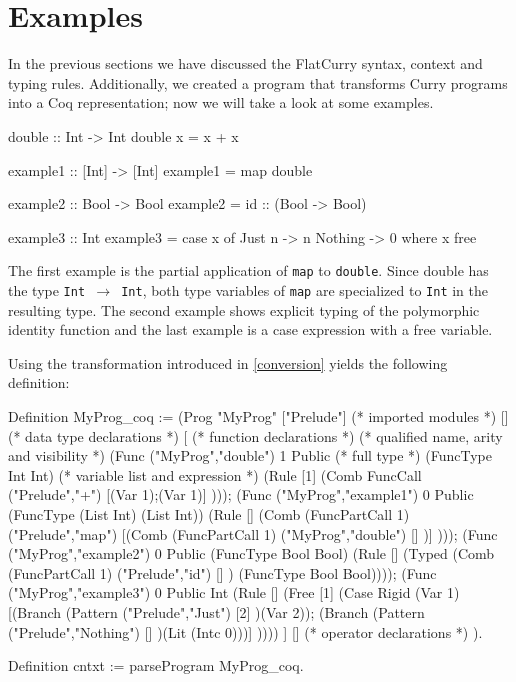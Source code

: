 \documentclass[paper = a4, fleqn, abstract=on, twoside]{scrreprt}
\begin{document}
\section{Examples}
In the previous sections we have discussed the FlatCurry syntax, context and typing rules. Additionally, we created a program that transforms Curry programs into a Coq representation; now we will take a look at some examples.
\begin{flushleft}
	\begin{minipage}[t]{.4 \linewidth}
\begin{haskellcode}
double :: Int -> Int
double x = x + x

example1 :: [Int] -> [Int]
example1 = map double

example2 :: Bool -> Bool
example2 = id :: (Bool -> Bool)
\end{haskellcode}
\end{minipage}
\hfill
\vrule
\hspace{.5em}
\begin{minipage}[t]{.5 \linewidth}
\begin{haskellcode}
example3 :: Int
example3 = case x of
             Just n  -> n
             Nothing -> 0
           where x free
\end{haskellcode}
\end{minipage}
\end{flushleft}
The first example is the partial application of \texttt{map} to \texttt{double}. Since double has the type \texttt{Int $\rightarrow$ Int}, both type variables of \texttt{map} are specialized to \texttt{Int} in the resulting type. The second example shows explicit typing of the polymorphic identity function and the last example is a case expression with a free variable.
\par\noindent
Using the transformation introduced in \autoref{conversion} yields the following definition:
\begin{coqcode}
Definition MyProg_coq :=  (Prog "MyProg"
["Prelude"] (* imported modules *)
[] (* data type declarations *)
[ (* function declarations *)
      (* qualified name,  arity and visibility *)
(Func ("MyProg","double") 1         Public 
      (* full type *)
      (FuncType Int Int)
      (* variable list and expression *)
      (Rule  [1] (Comb FuncCall ("Prelude","+") [(Var 1);(Var 1)] )));
(Func ("MyProg","example1") 0  Public 
      (FuncType (List Int) (List Int))
      (Rule  [] (Comb (FuncPartCall 1) ("Prelude","map") [(Comb (FuncPartCall 1)
      ("MyProg","double") [] )] )));
(Func ("MyProg","example2") 0  Public 
      (FuncType Bool Bool)
      (Rule  [] (Typed (Comb (FuncPartCall 1) ("Prelude","id") [] )
      (FuncType Bool Bool))));
(Func ("MyProg","example3") 0  Public 
      Int
      (Rule  [] (Free  [1] (Case Rigid (Var 1) 
        [(Branch (Pattern ("Prelude","Just") [2] )(Var 2));
         (Branch (Pattern ("Prelude","Nothing") [] )(Lit (Intc 0)))] ))))
]
[] (* operator declarations *)
).

Definition cntxt := parseProgram MyProg_coq.
\end{coqcode}
\end{document}
